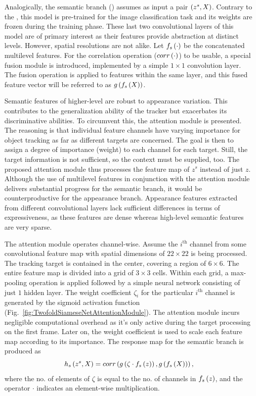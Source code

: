 Analogically, the semantic branch () assumes as input a pair $\left( {z^s, X} \right)$. Contrary to the , this model is pre-trained for the image classification task and its weights are frozen during the training phase. These last two convolutional layers of this model are of primary interest as their features provide abstraction at distinct levels. However, spatial resolutions are not alike. Let ${f_s} \left( \cdot \right)$ be the concatenated multilevel features. For the correlation operation (${corr} \left( \cdot \right)$) to be usable, a special fusion module is introduced, implemented by a simple $1 \times 1$ convolution layer. The fusion operation is applied to features within the same layer, and this fused feature vector will be referred to as ${g} \left( {f_s} \left( X \right) \right)$.

Semantic features of higher-level are robust to appearance variation. This contributes to the generalization ability of the tracker but exacerbates its discriminative abilities. To circumvent this, the attention module is presented. The reasoning is that individual feature channels have varying importance for object tracking as far as different targets are concerned. The goal is then to assign a degree of importance (weight) to each channel for each target. Still, the target information is not sufficient, so the context must be supplied, too. The proposed attention module thus processes the feature map of $z^s$ instead of just $z$. Although the use of multilevel features in conjunction with the attention module delivers substantial progress for the semantic branch, it would be counterproductive for the appearance branch. Appearance features extracted from different convolutional layers lack sufficient differences in terms of expressiveness, as these features are dense whereas high-level semantic features are very sparse.

The attention module operates channel-wise. Assume the $i^{\text{th}}$ channel from some convolutional feature map with spatial dimensions of $22 \times 22$ is being processed. The tracking target is contained in the center, covering a region of $6 \times 6$. The entire feature map is divided into a grid of $3 \times 3$ cells. Within each grid, a max-pooling operation is applied followed by a simple neural network consisting of just $1$ hidden layer. The weight coefficient $\zeta_i$ for the particular $i^{\text{th}}$ channel is generated by the sigmoid activation function (Fig.~\ref{fig:TwofoldSiameseNetAttentionModule}). The attention module incurs negligible computational overhead as it's only active during the target processing on the first frame. Later on, the weight coefficient is used to scale each feature map according to its importance. The response map for the semantic branch is produced as
\begin{equation}
    {h_s} \left( z^s, X \right) =
    {corr} \left( 
        {g} \left( \zeta \cdot {f_s} \left( z \right) \right),
        {g} \left( {f_s} \left( X \right) \right)
     \right),
\end{equation}
where the no. of elements of $\zeta$ is equal to the no. of channels in ${f_s} \left( z \right)$, and the operator $\cdot$ indicates an element-wise multiplication.

